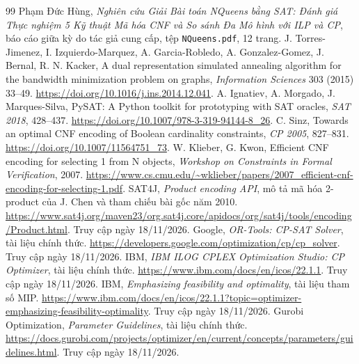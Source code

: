 \documentclass[a4paper,fleqn]{cas-sc}
\newcommand{\code}[1]{\nolinkurl{#1}}
\begin{document}
\begin{thebibliography}{99}
Phạm Đức Hùng, \emph{Nghiên cứu Giải Bài toán NQueens bằng SAT: Đánh giá Thực nghiệm 5 Kỹ thuật Mã hóa CNF và So sánh Đa Mô hình với ILP và CP}, báo cáo giữa kỳ do tác giả cung cấp, tệp \code{NQueens.pdf}, 12 trang.
J. Torres-Jimenez, I. Izquierdo-Marquez, A. Garcia-Robledo, A. Gonzalez-Gomez, J. Bernal, R. N. Kacker,
A dual representation simulated annealing algorithm for the bandwidth minimization problem on graphs,
\emph{Information Sciences} 303 (2015) 33--49. \url{https://doi.org/10.1016/j.ins.2014.12.041}.
A. Ignatiev, A. Morgado, J. Marques-Silva, PySAT: A Python toolkit for prototyping with SAT oracles,
\emph{SAT 2018}, 428--437. \url{https://doi.org/10.1007/978-3-319-94144-8_26}.
C. Sinz, Towards an optimal CNF encoding of Boolean cardinality constraints,
\emph{CP 2005}, 827--831. \url{https://doi.org/10.1007/11564751_73}.
W. Klieber, G. Kwon, Efficient CNF encoding for selecting 1 from N objects,
\emph{Workshop on Constraints in Formal Verification}, 2007.
\url{https://www.cs.cmu.edu/~wklieber/papers/2007_efficient-cnf-encoding-for-selecting-1.pdf}.
SAT4J, \emph{Product encoding API}, mô tả mã hóa 2-product của J. Chen và tham chiếu bài gốc năm 2010.
\url{https://www.sat4j.org/maven23/org.sat4j.core/apidocs/org/sat4j/tools/encoding/Product.html}. Truy cập ngày 18/11/2026.
Google, \emph{OR-Tools: CP-SAT Solver}, tài liệu chính thức.
\url{https://developers.google.com/optimization/cp/cp_solver}. Truy cập ngày 18/11/2026.
IBM, \emph{IBM ILOG CPLEX Optimization Studio: CP Optimizer}, tài liệu chính thức.
\url{https://www.ibm.com/docs/en/icos/22.1.1}. Truy cập ngày 18/11/2026.
IBM, \emph{Emphasizing feasibility and optimality}, tài liệu tham số MIP.
\url{https://www.ibm.com/docs/en/icos/22.1.1?topic=optimizer-emphasizing-feasibility-optimality}. Truy cập ngày 18/11/2026.
Gurobi Optimization, \emph{Parameter Guidelines}, tài liệu chính thức.
\url{https://docs.gurobi.com/projects/optimizer/en/current/concepts/parameters/guidelines.html}. Truy cập ngày 18/11/2026.
\end{thebibliography}
\end{document}
